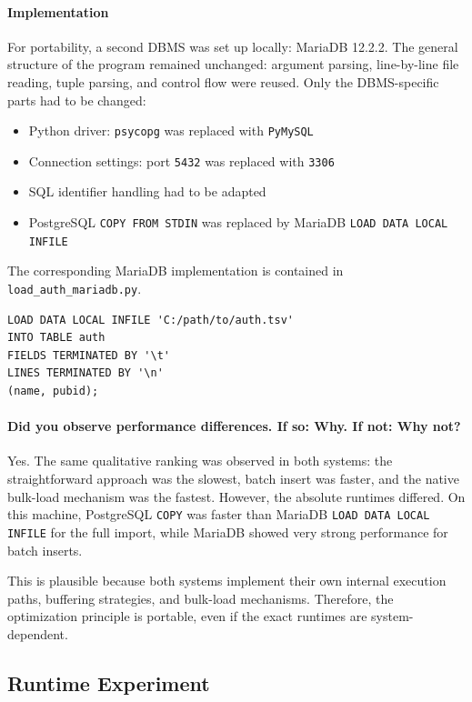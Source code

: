\documentclass[11pt]{scrartcl}
\begin{document}
\paragraph{Implementation}

For portability, a second DBMS was set up locally: MariaDB 12.2.2. The general structure of the program remained unchanged: argument parsing, line-by-line file reading, tuple parsing, and control flow were reused. Only the DBMS-specific parts had to be changed:

\begin{itemize}
  \item Python driver: \texttt{psycopg} was replaced with \texttt{PyMySQL}
  \item Connection settings: port \texttt{5432} was replaced with \texttt{3306}
  \item SQL identifier handling had to be adapted
  \item PostgreSQL \texttt{COPY FROM STDIN} was replaced by MariaDB \texttt{LOAD DATA LOCAL INFILE}
\end{itemize}

The corresponding MariaDB implementation is contained in \texttt{load\_auth\_mariadb.py}.

\begin{lstlisting}[style=dbtsql]
LOAD DATA LOCAL INFILE 'C:/path/to/auth.tsv'
INTO TABLE auth
FIELDS TERMINATED BY '\t'
LINES TERMINATED BY '\n'
(name, pubid);
\end{lstlisting}

\paragraph{Did you observe performance differences. If so: Why. If not: Why not?}

Yes. The same qualitative ranking was observed in both systems: the straightforward approach was the slowest, batch insert was faster, and the native bulk-load mechanism was the fastest. However, the absolute runtimes differed. On this machine, PostgreSQL \texttt{COPY} was faster than MariaDB \texttt{LOAD DATA LOCAL INFILE} for the full import, while MariaDB showed very strong performance for batch inserts.

This is plausible because both systems implement their own internal execution paths, buffering strategies, and bulk-load mechanisms. Therefore, the optimization principle is portable, even if the exact runtimes are system-dependent.

\subsection*{Runtime Experiment}
\end{document}
